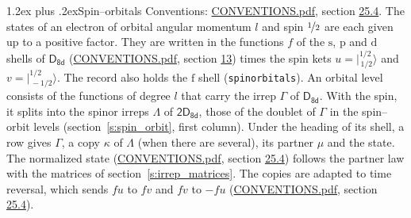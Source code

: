 \documentclass[10pt,a4paper]{article}
\makeatletter
\renewcommand\section{\@startsection{section}{1}{\z@}{-3ex plus -1ex minus -.2ex}%
  {1.2ex plus .2ex}{\normalfont\large\sffamily\bfseries\color{parttitle}}}
\numberwithin{equation}{section}
\newcommand{\grp}[1]{\mathsf{#1}}
\newcommand{\orbital}[1]{\mathrm{#1}}
\newcommand{\mult}{\kappa}
\newcommand{\intx}{\mu}
\newcommand{\jm}[2]{\bigl\lvert{}^{#1}_{\,#2}\bigr\rangle}
\makeatother
\begin{document}
\section{Spin--orbitals}\label{s:spin_orbitals}
Conventions: \href{../../CONVENTIONS.pdf}{CONVENTIONS.pdf}, section \href{../../CONVENTIONS.pdf\#conv.25.4}{25.4}.
\leavevmode\label{n:index.orbital.l}The states of an electron of orbital angular momentum $l$ and spin $\nicefrac{1}{2}$ are each given up to a positive factor. \label{n:local.spinor.uv}\label{n:local.function.f}They are written in the functions $f$ of the $\orbital{s}$, $\orbital{p}$ and $\orbital{d}$ shells of \href{../../../rotation/data/pdf/D8d.pdf}{$\grp{D_{8d}}$} (\href{../../CONVENTIONS.pdf}{CONVENTIONS.pdf}, section \href{../../../rotation/CONVENTIONS.pdf\#conv.13}{13}) times the spin kets $u = \jm{1/2}{1/2}$ and $v = \jm{1/2}{-1/2}$. The record also holds the $\orbital{f}$ shell (\texttt{spinorbitals}). An orbital level consists of the functions of degree $l$ that carry the irrep $\Gamma$ of \href{../../../rotation/data/pdf/D8d.pdf}{$\grp{D_{8d}}$}. With the spin, it splits into the spinor irreps $\Lambda$ of $\grp{2D_{8d}}$, those of the doublet of $\Gamma$ in the spin--orbit levels (section~\ref{s:spin_orbit}, first column). \label{n:head.state}Under the heading of its shell, a row gives $\Gamma$, a copy $\mult$ of $\Lambda$ (when there are several), its partner $\intx$ and the state. The normalized state (\href{../../CONVENTIONS.pdf}{CONVENTIONS.pdf}, section \href{../../CONVENTIONS.pdf\#conv.25.4}{25.4}) follows the partner law with the matrices of section~\ref{s:irrep_matrices}. The copies are adapted to time reversal, which sends $f u$ to $f v$ and $f v$ to $-f u$ (\href{../../CONVENTIONS.pdf}{CONVENTIONS.pdf}, section \href{../../CONVENTIONS.pdf\#conv.25.4}{25.4}).
\end{document}
